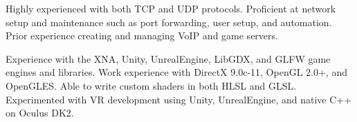 \vspace{-3mm}
\vspace{\acvSectionContentTopSkip}

\begin{cvparagraph}

Highly experienced with both TCP and UDP protocols. Proficient at network setup and maintenance such as port forwarding, user setup, and automation. Prior experience creating and managing VoIP and game servers.
\end{cvparagraph}


\begin{cvparagraph}

Experience with the XNA, Unity, UnrealEngine, LibGDX, and GLFW game engines and libraries. Work experience with DirectX 9.0c-11, OpenGL 2.0+, and OpenGLES. Able to write custom shaders in both HLSL and GLSL. Experimented with VR development using Unity, UnrealEngine, and native C++ on Oculus DK2.
\end{cvparagraph}
